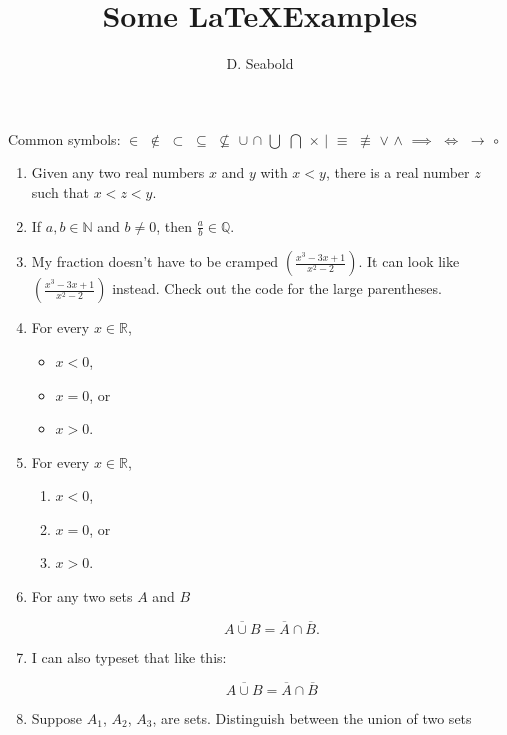 \documentclass[12pt]{article}
\newcommand{\Q}{\mathbb Q}
\newcommand{\N}{\mathbb N}
\newcommand{\R}{\mathbb R}
\begin{document}
\title{Some \LaTeX Examples}
\author{D. Seabold}

\maketitle

\noindent
Common symbols: $\in$ $\notin$ $\subset$ $\subseteq$ $\nsubseteq$ $\cup$ $\cap$ $\bigcup$ $\bigcap$ $\times$ $\mid$ $\equiv$ $\not\equiv$ $\vee$ $\wedge$ $\implies$ $\iff$ $\longrightarrow$ $\circ$

\begin{enumerate}
\item Given any two real numbers $x$ and $y$ with $x<y$, there is a real number $z$ such that $x<z<y$.

\item  If $a, b\in\N$ and $b\neq 0$, then $\frac{a}{b} \in \Q$.
        
\item My fraction doesn't have to be cramped $(\frac{x^3-3x+1}{x^2-2})$. It can look like $\left(\displaystyle\frac{x^3-3x+1}{x^2-2}\right)$ instead. Check out the code for the large parentheses.

\item For every $x\in \R$, 
    \begin{itemize}
    \item  $x<0$, 
    \item  $x=0$, or
    \item  $x>0$.
    \end{itemize}
    
\item For every $x\in \R$,
    \begin{enumerate}
    \item  $x<0$,
    \item  $x=0$, or
    \item  $x>0$.
    \end{enumerate}
    
\item  For any two sets $A$ and $B$

    $$\overline{A\cup B}=\overline{A}\cap\overline{B}.$$
    
\item  I can also typeset that like this:

    \[ \overline{A\cup B}=\overline{A}\cap\overline{B} \]
    
\item  Suppose $A_1$, $A_2$, $A_3$, are sets. Distinguish between the union of two sets
    

\end{enumerate}
\end{document}
